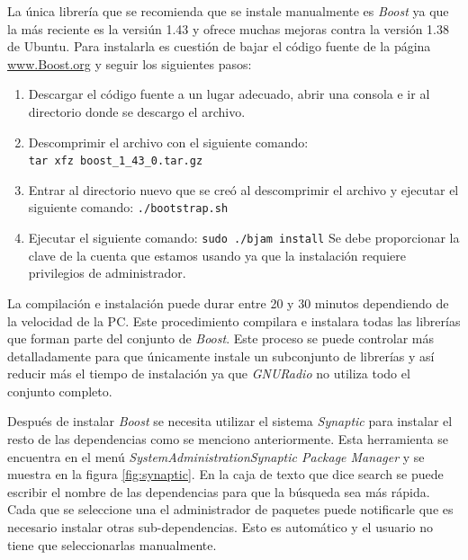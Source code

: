 La \'unica librer\'ia que se recomienda que se instale manualmente es
\emph{Boost} ya que la m\'as reciente es la versi\'un 1.43 y ofrece muchas
mejoras contra la versi\'on 1.38 de Ubuntu. Para instalarla es cuesti\'on de bajar
el c\'odigo fuente de la p\'agina \url{www.Boost.org} y seguir los siguientes
pasos:

\begin{enumerate}
  \item Descargar el c\'odigo fuente a un lugar adecuado, abrir una consola e
  ir al directorio donde se descargo el archivo.
  \item Descomprimir el archivo con el siguiente comando:\\
  \verb|tar xfz boost_1_43_0.tar.gz|
  \item Entrar al directorio nuevo que se cre\'o al descomprimir el archivo y
  ejecutar el siguiente comando: \verb|./bootstrap.sh|
  \item Ejecutar el siguiente comando: \verb|sudo ./bjam install| Se debe
  proporcionar la clave de la cuenta que estamos usando ya que la instalaci\'on
  requiere privilegios de administrador.
\end{enumerate}

La compilaci\'on e instalaci\'on puede durar entre 20 y 30 minutos dependiendo
de la velocidad de la PC. Este procedimiento compilara e instalara todas las
librer\'ias que forman parte del conjunto de \emph{Boost}. Este proceso se puede
controlar m\'as detalladamente para que \'unicamente instale un subconjunto de
librer\'ias y as\'i reducir m\'as el tiempo de instalaci\'on ya que
\emph{GNURadio} no utiliza todo el conjunto completo.

Despu\'es de instalar \emph{Boost} se necesita utilizar el sistema
\emph{Synaptic} para instalar el resto de las dependencias como se menciono
anteriormente. Esta herramienta se encuentra en el men\'u
\emph{SystemAdministrationSynaptic Package Manager} y se
muestra en la figura \ref{fig:synaptic}. En la caja de texto que dice search se
puede escribir el nombre de las dependencias para que la b\'usqueda sea m\'as r\'apida. Cada que se
seleccione una el administrador de paquetes puede notificarle que es necesario
instalar otras sub-dependencias. Esto es autom\'atico y el usuario no tiene que
seleccionarlas manualmente.

